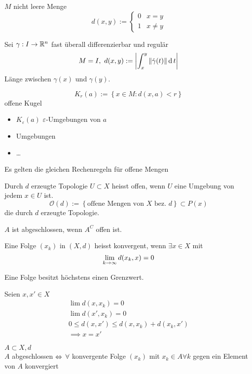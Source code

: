 \begin{Bsp}
  $M$ nicht leere Menge
  \[d(x,y):=\begin{cases}
    0&x=y\\1&x\neq y
  \end{cases}\]
\end{Bsp}
\begin{Bsp}
  Sei $\gamma:I\to\mathbb{R}^n$ fast überall differenzierbar und regulär
  \[M=I,\ d(x,y):=\Abs{\int^y_x\Norm{\dot\gamma(t)}\md t}\]
  Länge zwischen $\gamma(x)$ und $\gamma(y)$.
\end{Bsp}
\begin{Def}
  \[K_r(a):=\left\{ x\in M:d(x,a)<r \right\}\]
  offene Kugel
  \begin{itemize}
    \item $K_\varepsilon(a)$ $\varepsilon$-Umgebungen von $a$
    \item Umgebungen
    \item \ldots
  \end{itemize}
\end{Def}
\begin{Bem}
  Es gelten die gleichen Rechenregeln für offene Mengen
\end{Bem}
\begin{Def}{Durch $d$ erzeugte Topologie}
  $U\subset X$ heisst offen, wenn $U$ eine Umgebung von jedem $x\in U$ ist.
  \[\mathcal{O}(d):=\left\{ \text{offene Mengen von $X$ bez. $d$} \right\}\subset P(x)\]
  die durch $d$ erzeugte Topologie.
\end{Def}
\begin{Def}
  $A$ ist abgeschlossen, wenn $A^C$ offen ist.
\end{Def}
\begin{Def}
  Eine Folge $(x_k)$ in $(X,d)$ heisst konvergent, wenn $\exists x\in X$ mit
  \[\displaystyle\lim_{k\rightarrow\infty}d(x_k,x)=0\]
\end{Def}
\begin{Lem}
  Eine Folge besitzt höchstens einen Grenzwert.
\end{Lem}
\begin{Bew}
  Seien $x,x'\in X$
  \begin{gather*}
    \lim d(x,x_k)=0\\
    \lim d(x',x_k)=0\\
    0\leq d(x,x')\leq d(x,x_k)+d(x_k,x')\\
    \implies x=x'
  \end{gather*}
\end{Bew}
\begin{Sat}
  $A\subset X,d$\\
  $A$ abgeschlossen $\Leftrightarrow$ $\forall$ konvergente Folge $(x_k)$ mit $x_k\in A\forall k$ gegen ein Element von $A$ konvergiert
\end{Sat}
